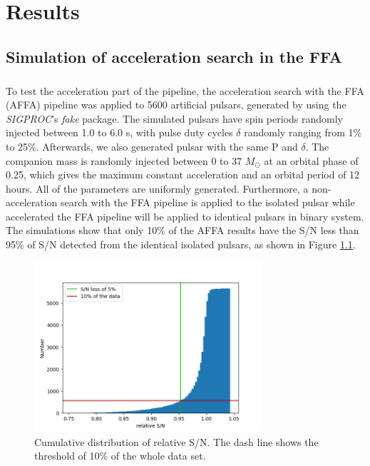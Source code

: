 \documentclass[thesis_msc.tex]{subfiles}
\begin{document}
\chapter{Results} \label{Chapter:result}
	\section{Simulation of acceleration search in the FFA } \label{AFFA}
  \paragraph{} To test the acceleration part of the pipeline, the  acceleration search with the FFA (AFFA) pipeline was applied to 5600 artificial pulsars, generated by using the \textit{SIGPROC}'s \textit{fake} package. The simulated pulsars have spin periods randomly injected between 1.0 to 6.0 s, with pulse duty cycles $\delta$ randomly ranging from 1\% to 25\%. Afterwards, we also generated pulsar with the same P and $\delta$. The companion mass is randomly injected between 0 to 37 $M_{\odot}$ at an orbital phase of 0.25, which gives the maximum constant acceleration and an orbital period of 12 hours. All of the parameters are uniformly generated. Furthermore, a non-acceleration search with the FFA pipeline is applied to the isolated pulsar while accelerated the FFA pipeline will be applied to identical pulsars in binary system. The simulations show that only 10\% of the AFFA results have the S/N less than 95\% of S/N detected from the identical isolated pulsars, as shown in Figure \ref{his}.
  
  \begin{figure}[h]
\centering
\includegraphics[width=0.75\textwidth]{figures/dist_dash}
\caption{Cumulative distribution of relative S/N. The dash line shows the threshold of 10\% of the whole data set. }\label{his}
\end{figure}
\end{document}
